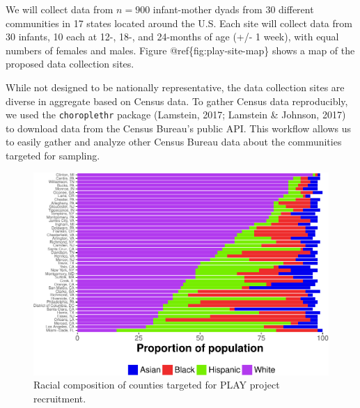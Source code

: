 \documentclass[english,man]{apa6}
\theoremstyle{definition}
\theoremstyle{definition}
\theoremstyle{definition}
\theoremstyle{remark}
\begin{document}
We will collect data from \(n=900\) infant-mother dyads from 30
different communities in 17 states located around the U.S. Each site
will collect data from 30 infants, 10 each at 12-, 18-, and 24-months of
age (+/- 1 week), with equal numbers of females and males. Figure
@ref\{fig:play-site-map\} shows a map of the proposed data collection
sites.

While not designed to be nationally representative, the data collection
sites are diverse in aggregate based on Census data. To gather Census
data reproducibly, we used the \texttt{choroplethr} package (Lamstein,
2017; Lamstein \& Johnson, 2017) to download data from the Census
Bureau's public API. This workflow allows us to easily gather and
analyze other Census Bureau data about the communities targeted for
sampling.

\begin{figure}

{\centering \includegraphics{figs/race-by-county-all-regions-plot-1} 

}

\caption{Racial composition of counties targeted for PLAY project recruitment.}\label{fig:race-by-county}
\end{figure}
\end{document}

